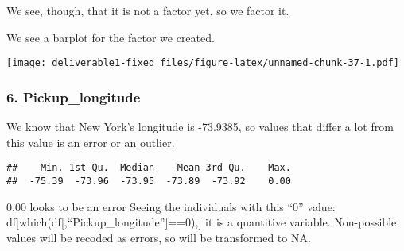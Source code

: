 \documentclass[
  18pt,
  a4paper]{article}
\newenvironment{Shaded}{\begin{snugshade}}{\end{snugshade}}
\newcommand{\CommentTok}[1]{\textcolor[rgb]{0.56,0.35,0.01}{\textit{#1}}}
\newcommand{\DataTypeTok}[1]{\textcolor[rgb]{0.13,0.29,0.53}{#1}}
\newcommand{\DecValTok}[1]{\textcolor[rgb]{0.00,0.00,0.81}{#1}}
\newcommand{\KeywordTok}[1]{\textcolor[rgb]{0.13,0.29,0.53}{\textbf{#1}}}
\newcommand{\NormalTok}[1]{#1}
\newcommand{\OperatorTok}[1]{\textcolor[rgb]{0.81,0.36,0.00}{\textbf{#1}}}
\newcommand{\StringTok}[1]{\textcolor[rgb]{0.31,0.60,0.02}{#1}}
\begin{document}
We see, though, that it is not a factor yet, so we factor it.

\begin{Shaded}
\end{Shaded}

We see a barplot for the factor we created.

\begin{Shaded}
\end{Shaded}

\texttt{[image: deliverable1-fixed\_files/figure-latex/unnamed-chunk-37-1.pdf]}

\hypertarget{pickup_longitude}{%
\subsubsection{6. Pickup\_longitude}\label{pickup_longitude}}

We know that New York's longitude is -73.9385, so values that differ a
lot from this value is an error or an outlier.

\begin{Shaded}
\end{Shaded}

\begin{verbatim}
##    Min. 1st Qu.  Median    Mean 3rd Qu.    Max. 
##  -75.39  -73.96  -73.95  -73.89  -73.92    0.00
\end{verbatim}

0.00 looks to be an error Seeing the individuals with this ``0'' value:
df{[}which(df{[},``Pickup\_longitude''{]}==0),{]} it is a quantitive
variable. Non-possible values will be recoded as errors, so will be
transformed to NA.

\begin{Shaded}
\end{Shaded}
\end{document}
